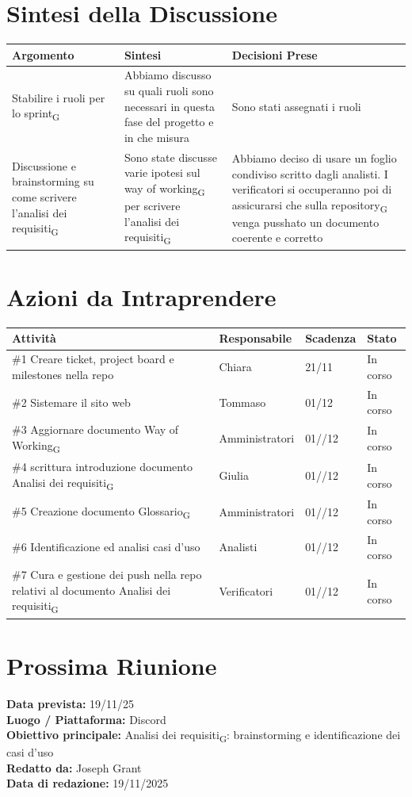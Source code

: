 \documentclass[a4paper,12pt]{article}
\newcommand{\gls}[1]{#1\textsubscript{G}}
\begin{document}
\section*{ Sintesi della Discussione}

\begin{longtable}{|p{}|p{}|p{}|}
\hline
\textbf{Argomento} & \textbf{Sintesi} & \textbf{Decisioni Prese} \\ \hline
 Stabilire i ruoli per lo \gls{sprint}&Abbiamo discusso su quali ruoli sono necessari in questa fase del progetto e in che misura&Sono stati assegnati i ruoli  \\ \hline
Discussione e brainstorming su come scrivere l'\gls{analisi dei requisiti}& Sono state discusse varie ipotesi sul \gls{way of working} per scrivere l'\gls{analisi dei requisiti}  &Abbiamo deciso di usare un foglio condiviso scritto dagli analisti. I verificatori si occuperanno poi di assicurarsi che sulla \gls{repository} venga pusshato un documento coerente e corretto  \\ \hline
\end{longtable}


\section*{ Azioni da Intraprendere}

\begin{longtable}{|p{}|p{}|p{}|p{}|}
\hline
\textbf{Attività} & \textbf{Responsabile} & \textbf{Scadenza} & \textbf{Stato} \\ \hline
 \#1 Creare ticket, project board e milestones nella repo&Chiara & 21/11 &In corso \\ \hline
  \#2 Sistemare il sito web&Tommaso  & 01/12 &In corso \\ \hline
  \#3 Aggiornare documento \gls{Way of Working}&Amministratori  & 01//12 &In corso \\ \hline
  \#4 scrittura introduzione documento \gls{Analisi dei requisiti} &Giulia  & 01//12 &In corso \\ \hline
  \#5 Creazione documento \gls{Glossario}&Amministratori  & 01//12 &In corso \\ \hline
  \#6 Identificazione ed analisi casi d'uso&Analisti  & 01//12 &In corso \\ \hline
  \#7 Cura e gestione dei push nella repo relativi al documento \gls{Analisi dei requisiti}&Verificatori  & 01//12 &In corso \\ \hline
  
\end{longtable}



\section*{ Prossima Riunione}
\textbf{Data prevista:} 19/11/25\\
\textbf{Luogo / Piattaforma:} Discord \\
\textbf{Obiettivo principale:} \gls{Analisi dei requisiti}: brainstorming e identificazione dei casi d'uso\\


\textbf{Redatto da:} Joseph Grant \\
\textbf{Data di redazione:} 19/11/2025
\end{document}
